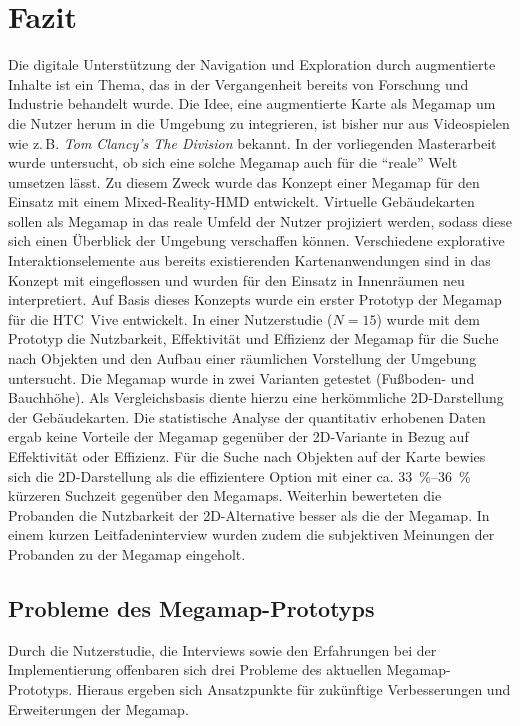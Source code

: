 \chapter{Fazit}
\label{chap:closing}
Die digitale Unterstützung der Navigation und Exploration durch augmentierte Inhalte ist ein Thema, das in der Vergangenheit bereits von Forschung und Industrie behandelt wurde.
Die Idee, eine augmentierte Karte als Megamap um die Nutzer herum in die Umgebung zu integrieren, ist bisher nur aus Videospielen wie z.\,B. \emph{Tom Clancy's The Division} bekannt.
In der vorliegenden Masterarbeit wurde untersucht, ob sich eine solche Megamap auch für die \enquote{reale} Welt umsetzen lässt.
Zu diesem Zweck wurde das Konzept einer Megamap für den Einsatz mit einem Mixed-Reality-HMD entwickelt.
Virtuelle Gebäudekarten sollen als Megamap in das reale Umfeld der Nutzer projiziert werden, sodass diese sich einen Überblick der Umgebung verschaffen können.
Verschiedene explorative Interaktionselemente aus bereits existierenden Kartenanwendungen sind in das Konzept mit eingeflossen und wurden für den Einsatz in Innenräumen neu interpretiert.
Auf Basis dieses Konzepts wurde ein erster Prototyp der Megamap für die HTC~Vive entwickelt.
In einer Nutzerstudie ($N=15$) wurde mit dem Prototyp die Nutzbarkeit, Effektivität und Effizienz der Megamap für die Suche nach Objekten und den Aufbau einer räumlichen Vorstellung der Umgebung untersucht.
Die Megamap wurde in zwei Varianten getestet (Fußboden- und Bauchhöhe).
Als Vergleichsbasis diente hierzu eine herkömmliche 2D-Darstellung der Gebäudekarten.
Die statistische Analyse der quantitativ erhobenen Daten ergab keine Vorteile der Megamap gegenüber der 2D-Variante in Bezug auf Effektivität oder Effizienz.
Für die Suche nach Objekten auf der Karte bewies sich die 2D-Darstellung als die effizientere Option mit einer ca. \SIrange{33}{36}{\percent} kürzeren Suchzeit gegenüber den Megamaps.
Weiterhin bewerteten die Probanden die Nutzbarkeit der 2D-Alternative besser als die der Megamap.
In einem kurzen Leitfadeninterview wurden zudem die subjektiven Meinungen der Probanden zu der Megamap eingeholt.

\section{Probleme des Megamap-Prototyps}
Durch die Nutzerstudie, die Interviews sowie den Erfahrungen bei der Implementierung offenbaren sich drei Probleme des aktuellen Megamap-Prototyps.
Hieraus ergeben sich Ansatzpunkte für zukünftige Verbesserungen und Erweiterungen der Megamap.

